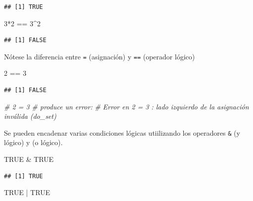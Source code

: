 \documentclass[
]{book}
\newenvironment{Shaded}{\begin{snugshade}}{\end{snugshade}}
\newcommand{\CommentTok}[1]{\textcolor[rgb]{0.56,0.35,0.01}{\textit{#1}}}
\newcommand{\ConstantTok}[1]{\textcolor[rgb]{0.00,0.00,0.00}{#1}}
\newcommand{\DecValTok}[1]{\textcolor[rgb]{0.00,0.00,0.81}{#1}}
\newcommand{\SpecialCharTok}[1]{\textcolor[rgb]{0.00,0.00,0.00}{#1}}
\theoremstyle{break}
\begin{document}
\begin{verbatim}
## [1] TRUE
\end{verbatim}

\begin{Shaded}
\begin{Highlighting}[]
\DecValTok{3}\SpecialCharTok{*}\DecValTok{2} \SpecialCharTok{==} \DecValTok{3}\SpecialCharTok{\^{}}\DecValTok{2}
\end{Highlighting}
\end{Shaded}

\begin{verbatim}
## [1] FALSE
\end{verbatim}

Nótese la diferencia entre \texttt{=} (asignación) y \texttt{==} (operador lógico)

\begin{Shaded}
\begin{Highlighting}[]
\DecValTok{2} \SpecialCharTok{==} \DecValTok{3}
\end{Highlighting}
\end{Shaded}

\begin{verbatim}
## [1] FALSE
\end{verbatim}

\begin{Shaded}
\begin{Highlighting}[]
\CommentTok{\# 2 = 3 \# produce un error:}
\CommentTok{\# Error en 2 = 3 : lado izquierdo de la asignación inválida (do\_set)}
\end{Highlighting}
\end{Shaded}

Se pueden encadenar varias condiciones lógicas utiilizando
los operadores \texttt{\&} (y lógico) y \texttt{\textbar{}} (o lógico).

\begin{Shaded}
\begin{Highlighting}[]
\ConstantTok{TRUE} \SpecialCharTok{\&} \ConstantTok{TRUE}
\end{Highlighting}
\end{Shaded}

\begin{verbatim}
## [1] TRUE
\end{verbatim}

\begin{Shaded}
\begin{Highlighting}[]
\ConstantTok{TRUE} \SpecialCharTok{|} \ConstantTok{TRUE}
\end{Highlighting}
\end{Shaded}
\end{document}
